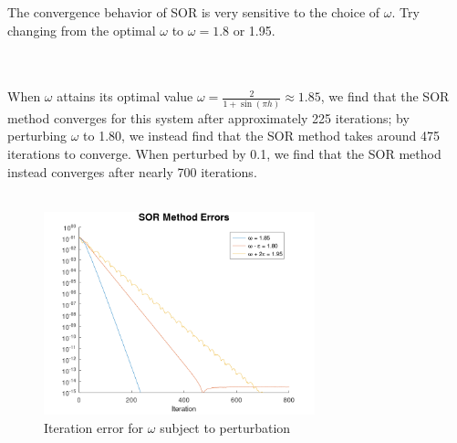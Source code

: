 The convergence behavior of SOR is very sensitive to the choice of $\omega$. Try changing from the optimal $\omega$ to 
$\omega = 1.8$ or 1.95.

\begin{solution}\ \\\\
    When $\omega$ attains its optimal value $\omega = \frac{2}{1 + \sin{(\pi h)}} \approx 1.85$, we find that the SOR 
    method converges for this system after approximately 225 iterations; by perturbing $\omega$ to 1.80, we instead find
    that the SOR method takes around 475 iterations to converge. When perturbed by 0.1, we find that the SOR method 
    instead converges after nearly 700 iterations. \\\\

    \begin{figure}[h]
        \centering
        \includegraphics[width=0.7\textwidth]{problem_1b_sor_matrix_splitting_error_800_iterations.png}
        \caption{Iteration error for $\omega$ subject to perturbation}
    \end{figure}
\end{solution}